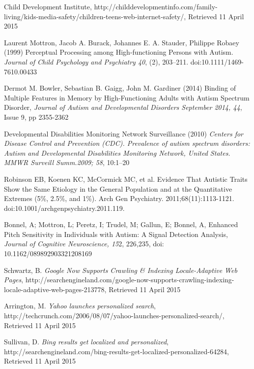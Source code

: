 \documentclass[a4paper, 11pt]{article}
\begin{document}
\begin{justify}
\end{justify}

\clearpage
\begin{thebibliography}{100}
 Child Development Institute, http://childdevelopmentinfo.com/family-living/kids-media-safety/children-teens-web-internet-safety/, Retrieved 11 April 2015

 Laurent Mottron, Jacob A. Burack, Johannes E. A. Stauder, Philippe Robaey (1999) Perceptual Processing among High-functioning Persons with Autism. \textit{Journal of Child Psychology and Psychiatry 40}, (2), 203–211. doi:10.1111/1469-7610.00433

Dermot M. Bowler, Sebastian B. Gaigg, John M. Gardiner (2014) Binding of Multiple Features in Memory by High-Functioning Adults with Autism Spectrum Disorder, \textit{Journal of Autism and Developmental Disorders September 2014, 44}, Issue 9, pp 2355-2362

Developmental Disabilities Monitoring Network Surveillance (2010) \textit{Centers for Disease Control and Prevention (CDC). Prevalence of autism spectrum disorders: Autism and Developmental Disabilities Monitoring Network, United States. MMWR Surveill Summ.2009; 58}, 10:1–20

 Robinson EB, Koenen KC, McCormick MC, et al. Evidence That Autistic Traits Show the Same Etiology in the General Population and at the Quantitative Extremes (5\%, 2.5\%, and 1\%). Arch Gen Psychiatry. 2011;68(11):1113-1121. doi:10.1001/archgenpsychiatry.2011.119.

 Bonnel, A; Mottron, L; Peretz, I; Trudel, M; Gallun, E; Bonnel, A, Enhanced Pitch Sensitivity in Individuals with Autism: A Signal Detection Analysis, \textit{Journal of Cognitive Neuroscience, 15}2, 226,235, doi: 10.1162/089892903321208169

Schwartz, B. \textit{Google Now Supports Crawling \& Indexing Locale-Adaptive Web Pages}, http://searchengineland.com/google-now-supports-crawling-indexing-locale-adaptive-web-pages-213778, Retrieved 11 April 2015

Arrington, M. \textit{Yahoo launches personalized search}, http://techcrunch.com/2006/08/07/yahoo-launches-personalized-search/, Retrieved 11 April 2015

Sullivan, D. \textit{Bing results get localized and personalized}, http://searchengineland.com/bing-results-get-localized-personalized-64284, Retrieved 11 April 2015


\end{thebibliography}
\end{document}
